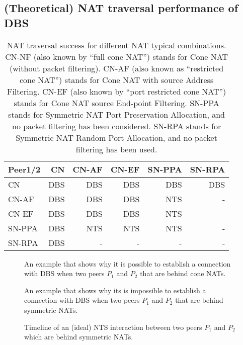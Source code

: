 \subsection{(Theoretical) NAT traversal performance of DBS}

\begin{table}
  \centering
  \begin{tabular}{l|r|r|r|r|r}
    Peer1/2 & CN    & CN-AF & CN-EF & SN-PPA & SN-RPA \\
    \hline
    CN      & DBS   & DBS   & DBS   & DBS    & DBS    \\
    CN-AF   & DBS   & DBS   & DBS   & NTS    & -      \\
    CN-EF   & DBS   & DBS   & DBS   & NTS    & -      \\
    SN-PPA  & DBS   & NTS   & NTS   & NTS    & -      \\
    SN-RPA  & DBS   & -     & -     & -      & -
  \end{tabular}
  \caption{NAT traversal success for different NAT typical
    combinations. CN-NF (also known by ``full cone NAT'') stands for
    Cone NAT (without packet filtering). CN-AF (also known as
    ``restricted cone NAT'') stands for Cone NAT with source Address
    Filtering. CN-EF (also known by ``port restricted cone NAT'')
    stands for Cone NAT source End-point Filtering. SN-PPA stands for
    Symmetric NAT Port Preservation Allocation, and no packet
    filtering has been considered. SN-RPA stands for Symmetric NAT
    Random Port Allocation, and no packet filtering has been used.
    \label{tab:theoretical}}
\end{table}

\begin{figure}
  \caption{An example that shows why it is possible to establish a
    connection with DBS when two peers $P_1$ and $P_2$ that are behind
    cone NATs.\label{fig:UHP_Hole_Punching_RCN}}
\end{figure}

\begin{figure}
  \caption{An example that shows why its is impossible to establish a
    connection with DBS when two peers $P_1$ and $P_2$ that are behind
    symmetric NATs.\label{fig:UDP_Hole_Punching_SN_failure}}
\end{figure}

\begin{figure*}
  \caption{Timeline of an (ideal) NTS interaction between two peers
    $P_1$ and $P_2$ which are behind symmetric NATs.
    \label{fig:SNTuCPP}}
\end{figure*}

